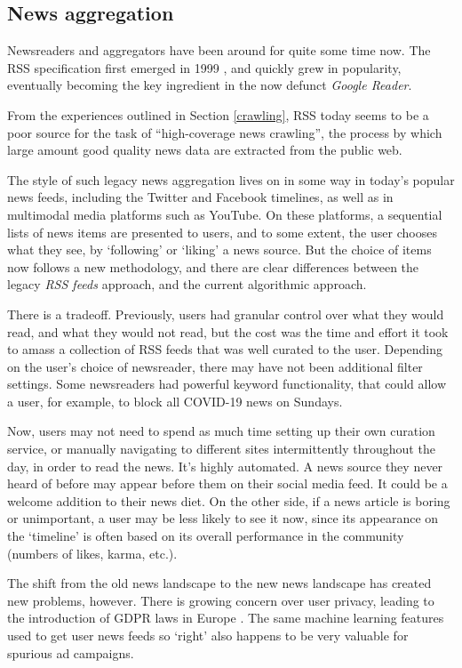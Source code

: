 \subsection{News aggregation}
Newsreaders and aggregators have been around for quite some time
now.  The RSS specification first emerged in 1999 \cite{rss1999},
and quickly grew in popularity, eventually becoming the key
ingredient in the now defunct {\it Google Reader}.

From the experiences outlined in Section \ref{crawling}, RSS today seems to
be a poor source for the task of ``high-coverage news
crawling'', the process by which large amount good quality
news data are extracted from the public web.

The style of such legacy news aggregation lives on in some way
in today's popular news feeds, including the Twitter and
Facebook timelines, as well as in multimodal media platforms such as
YouTube.  On these platforms, a sequential lists of news items are
presented to users, and to some extent, the user chooses what they see,
by `following' or `liking' a news source.  But the choice of items now
follows a new methodology, and there are clear differences between the
legacy {\it RSS feeds} approach, and the current algorithmic approach.

There is a tradeoff.  Previously, users had granular control over
what they would read, and what they would not read, but the cost
was the time and effort it took to amass a collection of RSS feeds
that was well curated to the user.  Depending on the user's choice
of newsreader, there may have not been additional filter settings.
Some newsreaders had powerful keyword functionality, that could allow
a user, for example, to block all COVID-19 news on Sundays.

Now, users may not need to
spend as much time setting up their own curation service, or
manually navigating to different sites intermittently throughout
the day, in order to read the news.  It's highly automated.  A news
source they never heard of before may appear before them on their
social media feed.  It could be a welcome addition to their news
diet.  On the other side, if a news article is boring or unimportant,
a user may be less likely to see it now, since its appearance on the
`timeline' is often based on its overall performance in the community
(numbers of likes, karma, etc.).

The shift from the old news landscape to the new news landscape has
created new problems, however.  There is growing concern over user
privacy, leading to the introduction of GDPR laws in Europe \cite{gdpr}.
The same machine learning features used to get user news feeds
so `right' also happens to be very valuable for spurious ad campaigns.

